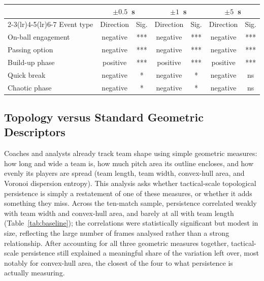 \begin{table}
{\begin{tabular}{lcccccc} \toprule
 & \multicolumn{2}{c}{$\pm 0.5$~s} & \multicolumn{2}{c}{$\pm 1$~s} & \multicolumn{2}{c}{$\pm 5$~s} \\
\cmidrule(lr){2-3}\cmidrule(lr){4-5}\cmidrule(lr){6-7}
Event type & Direction & Sig. & Direction & Sig. & Direction & Sig. \\ \midrule
On-ball engagement & negative & *** & negative & *** & negative & *** \\
Passing option     & negative & *** & negative & *** & negative & *** \\
Build-up phase     & positive & *** & positive & *** & positive & *** \\
Quick break        & negative & *   & negative & *   & negative & ns  \\
Chaotic phase      & negative & *   & negative & *   & negative & ns  \\
\bottomrule
\end{tabular}}
\label{tab:windows}
\end{table}

\subsection{Topology versus Standard Geometric Descriptors}

Coaches and analysts already track team shape using simple geometric
measures: how long and wide a team is, how much pitch area its outline
encloses, and how evenly its players are spread (team length, team
width, convex-hull area, and Voronoi dispersion entropy). This analysis
asks whether tactical-scale topological persistence is simply a
restatement of one of these measures, or whether it adds something they
miss. Across the ten-match sample, persistence correlated weakly with
team width and convex-hull area, and barely at all with team length
(Table~\ref{tab:baseline}); the correlations were statistically
significant but modest in size, reflecting the large number of frames
analysed rather than a strong relationship. After accounting for all
three geometric measures together, tactical-scale persistence still
explained a meaningful share of the variation left over, most notably for
convex-hull area, the closest of the four to what persistence is
actually measuring.


